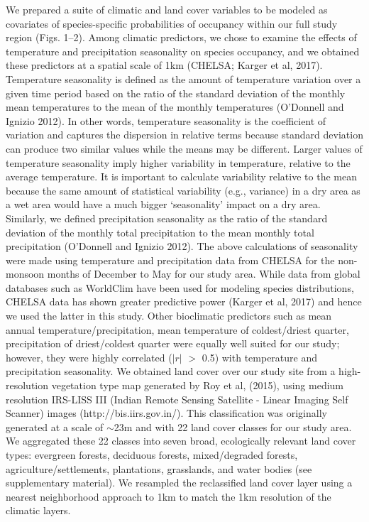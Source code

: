 We prepared a suite of climatic and land cover variables to be modeled as covariates of species-specific probabilities of occupancy within our full study region (Figs.
1–2).
Among climatic predictors, we chose to examine the effects of temperature and precipitation seasonality on species occupancy, and we obtained these predictors at a spatial scale of 1km (CHELSA; Karger et al, 2017).
Temperature seasonality is defined as the amount of temperature variation over a given time period based on the ratio of the standard deviation of the monthly mean temperatures to the mean of the monthly temperatures (O'Donnell and Ignizio 2012).
In other words, temperature seasonality is the coefficient of variation and captures the dispersion in relative terms because standard deviation can produce two similar values while the means may be different.
Larger values of temperature seasonality imply higher variability in temperature, relative to the average temperature.
It is important to calculate variability relative to the mean because the same amount of statistical variability (e.g., variance) in a dry area as a wet area would have a much bigger `seasonality' impact on a dry area.
Similarly, we defined precipitation seasonality as the ratio of the standard deviation of the monthly total precipitation to the mean monthly total precipitation (O'Donnell and Ignizio 2012).
The above calculations of seasonality were made using temperature and precipitation data from CHELSA for the non-monsoon months of December to May for our study area.
While data from global databases such as WorldClim have been used for modeling species distributions, CHELSA data has shown greater predictive power (Karger et al, 2017) and hence we used the latter in this study.
Other bioclimatic predictors such as mean annual temperature/precipitation, mean temperature of coldest/driest quarter, precipitation of driest/coldest quarter were equally well suited for our study; however, they were highly correlated ($|r|$ $>$ 0.5) with temperature and precipitation seasonality.
We obtained land cover over our study site from a high-resolution vegetation type map generated by Roy et al, (2015), using medium resolution IRS-LISS III (Indian Remote Sensing Satellite - Linear Imaging Self Scanner) images (http://bis.iirs.gov.in/).
This classification was originally generated at a scale of $\sim$23m and with 22 land cover classes for our study area.
We aggregated these 22 classes into seven broad, ecologically relevant land cover types: evergreen forests, deciduous forests, mixed/degraded forests, agriculture/settlements, plantations, grasslands, and water bodies (see supplementary material).
We resampled the reclassified land cover layer using a nearest neighborhood approach to 1km to match the 1km resolution of the climatic layers.

